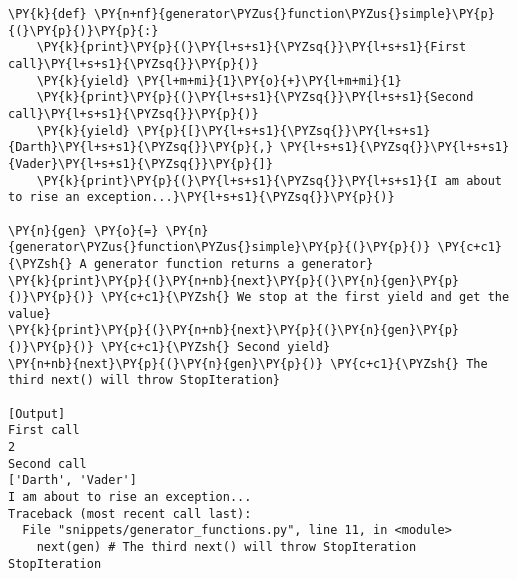 \begin{Verbatim}[label=\makebox{\url{https://github.com/lucabaldini/cmepda/tree/master/slides/latex/snippets/generator\_functions.py}},commandchars=\\\{\}]
\PY{k}{def} \PY{n+nf}{generator\PYZus{}function\PYZus{}simple}\PY{p}{(}\PY{p}{)}\PY{p}{:}
    \PY{k}{print}\PY{p}{(}\PY{l+s+s1}{\PYZsq{}}\PY{l+s+s1}{First call}\PY{l+s+s1}{\PYZsq{}}\PY{p}{)}
    \PY{k}{yield} \PY{l+m+mi}{1}\PY{o}{+}\PY{l+m+mi}{1}
    \PY{k}{print}\PY{p}{(}\PY{l+s+s1}{\PYZsq{}}\PY{l+s+s1}{Second call}\PY{l+s+s1}{\PYZsq{}}\PY{p}{)}
    \PY{k}{yield} \PY{p}{[}\PY{l+s+s1}{\PYZsq{}}\PY{l+s+s1}{Darth}\PY{l+s+s1}{\PYZsq{}}\PY{p}{,} \PY{l+s+s1}{\PYZsq{}}\PY{l+s+s1}{Vader}\PY{l+s+s1}{\PYZsq{}}\PY{p}{]}
    \PY{k}{print}\PY{p}{(}\PY{l+s+s1}{\PYZsq{}}\PY{l+s+s1}{I am about to rise an exception...}\PY{l+s+s1}{\PYZsq{}}\PY{p}{)}

\PY{n}{gen} \PY{o}{=} \PY{n}{generator\PYZus{}function\PYZus{}simple}\PY{p}{(}\PY{p}{)} \PY{c+c1}{\PYZsh{} A generator function returns a generator}
\PY{k}{print}\PY{p}{(}\PY{n+nb}{next}\PY{p}{(}\PY{n}{gen}\PY{p}{)}\PY{p}{)} \PY{c+c1}{\PYZsh{} We stop at the first yield and get the value}
\PY{k}{print}\PY{p}{(}\PY{n+nb}{next}\PY{p}{(}\PY{n}{gen}\PY{p}{)}\PY{p}{)} \PY{c+c1}{\PYZsh{} Second yield}
\PY{n+nb}{next}\PY{p}{(}\PY{n}{gen}\PY{p}{)} \PY{c+c1}{\PYZsh{} The third next() will throw StopIteration}

[Output]
First call
2
Second call
['Darth', 'Vader']
I am about to rise an exception...
Traceback (most recent call last):
  File "snippets/generator_functions.py", line 11, in <module>
    next(gen) # The third next() will throw StopIteration
StopIteration
\end{Verbatim}